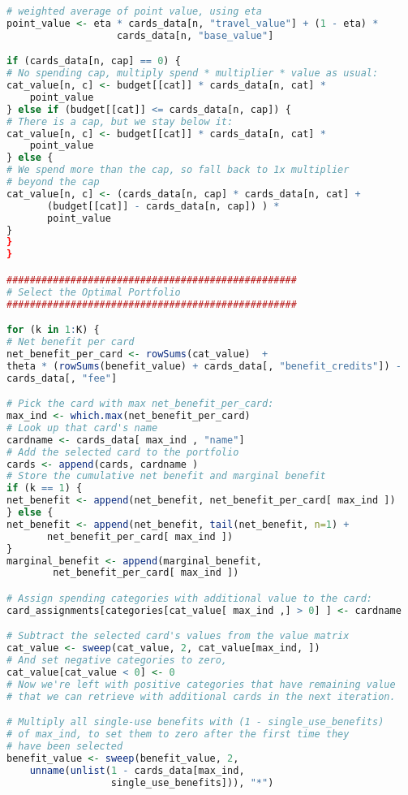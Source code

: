 \begin{lstlisting}[language=R]
# weighted average of point value, using eta
point_value <- eta * cards_data[n, "travel_value"] + (1 - eta) * 
                   cards_data[n, "base_value"]

if (cards_data[n, cap] == 0) {
# No spending cap, multiply spend * multiplier * value as usual:
cat_value[n, c] <- budget[[cat]] * cards_data[n, cat] * 
    point_value
} else if (budget[[cat]] <= cards_data[n, cap]) {
# There is a cap, but we stay below it:
cat_value[n, c] <- budget[[cat]] * cards_data[n, cat] * 
    point_value
} else {
# We spend more than the cap, so fall back to 1x multiplier 
# beyond the cap
cat_value[n, c] <- (cards_data[n, cap] * cards_data[n, cat] + 
       (budget[[cat]] - cards_data[n, cap]) ) * 
       point_value
}
}
}

##################################################
# Select the Optimal Portfolio
##################################################

for (k in 1:K) {
# Net benefit per card 
net_benefit_per_card <- rowSums(cat_value)  +
theta * (rowSums(benefit_value) + cards_data[, "benefit_credits"]) -
cards_data[, "fee"]

# Pick the card with max net_benefit_per_card:
max_ind <- which.max(net_benefit_per_card)
# Look up that card's name
cardname <- cards_data[ max_ind , "name"] 
# Add the selected card to the portfolio
cards <- append(cards, cardname )
# Store the cumulative net benefit and marginal benefit
if (k == 1) {
net_benefit <- append(net_benefit, net_benefit_per_card[ max_ind ])
} else {
net_benefit <- append(net_benefit, tail(net_benefit, n=1) + 
       net_benefit_per_card[ max_ind ])
}
marginal_benefit <- append(marginal_benefit, 
        net_benefit_per_card[ max_ind ])

# Assign spending categories with additional value to the card:
card_assignments[categories[cat_value[ max_ind ,] > 0] ] <- cardname

# Subtract the selected card's values from the value matrix 
cat_value <- sweep(cat_value, 2, cat_value[max_ind, ])
# And set negative categories to zero,
cat_value[cat_value < 0] <- 0
# Now we're left with positive categories that have remaining value 
# that we can retrieve with additional cards in the next iteration.

# Multiply all single-use benefits with (1 - single_use_benefits) 
# of max_ind, to set them to zero after the first time they 
# have been selected
benefit_value <- sweep(benefit_value, 2, 
    unname(unlist(1 - cards_data[max_ind, 
                  single_use_benefits])), "*")


\end{lstlisting}
